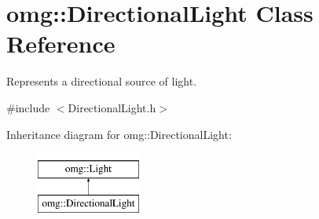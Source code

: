 \hypertarget{classomg_1_1_directional_light}{}\section{omg\+::Directional\+Light Class Reference}
\label{classomg_1_1_directional_light}


Represents a directional source of light.  




{\ttfamily \#include $<$Directional\+Light.\+h$>$}

Inheritance diagram for omg\+::Directional\+Light\+:\begin{figure}[H]
\begin{center}
\leavevmode
\includegraphics[height=2.000000cm]{classomg_1_1_directional_light}
\end{center}
\end{figure}
